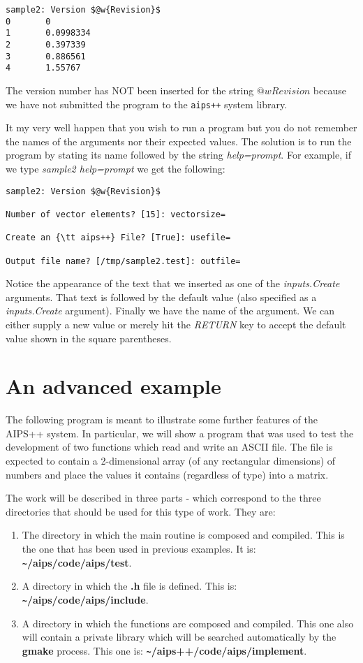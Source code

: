 \begin{verbatim}
sample2: Version $@w{Revision}$
0       0
1       0.0998334
2       0.397339
3       0.886561
4       1.55767
\end{verbatim}

The version number has NOT been inserted for the string {\em $@w{Revision}$}
because we have not submitted the program to the {\tt aips++} system library.

It my very well happen that you wish to run a program but you do not
remember the names of the arguments nor their expected values.
The solution is to run the program by stating its name
followed by the string {\em help=prompt}. For example, if we type
{\em sample2 help=prompt} we get the following:

\begin{verbatim}
sample2: Version $@w{Revision}$

Number of vector elements? [15]: vectorsize=

Create an {\tt aips++} File? [True]: usefile=

Output file name? [/tmp/sample2.test]: outfile=
\end{verbatim}

Notice the appearance of the text that we inserted as one of the
{\em inputs.Create} arguments. That text is followed by the default
value (also specified as a {\em inputs.Create} argument). Finally we
have the name of the argument.  We can either supply a new value or
merely hit the {\em RETURN} key to accept the default value shown in the
square parentheses.
\newpage
\section{An advanced example}

        The following program is meant to illustrate some further features of
the AIPS++ system.  In particular, we will show a program that was used to test
the development of two functions which read and write an ASCII file.
The file is expected to contain a 2-dimensional array (of any rectangular 
dimensions) of numbers and place the values it contains (regardless of type) 
into a matrix.

        The work will be described in three parts - which correspond to the
three directories that should be used for this type of work. They are:

\begin{enumerate}
\item The directory in which the main routine is composed and compiled. This is
the one that has been used in previous examples. It is:
{\bf \verb+~+/aips/code/aips/test}.

\item A directory in which the {\bf .h} file is defined. This is:
{\bf \verb+~+/aips/code/aips/include}.

\item A directory in which the functions are composed and compiled. This one also
will contain a private library which will be searched automatically by the
{\bf gmake} process. This one is: {\bf \verb+~+/aips++/code/aips/implement}.
\end{enumerate}

